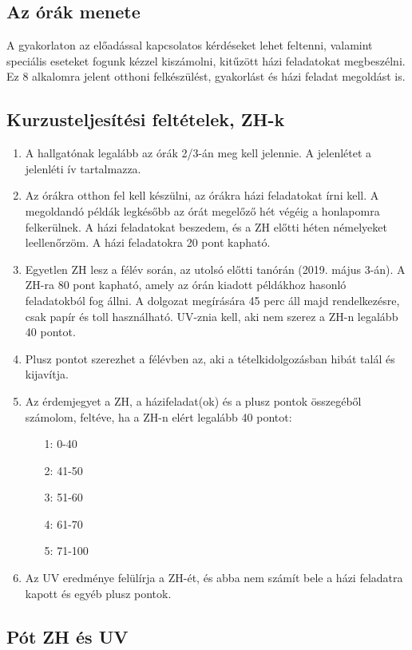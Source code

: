 \documentclass[12pt,a4paper]{scrartcl}
\begin{document}
\subsection{Az órák menete}
A gyakorlaton az előadással kapcsolatos kérdéseket lehet feltenni, valamint speciális eseteket fogunk kézzel kiszámolni, kitűzött házi feladatokat megbeszélni. Ez 8 alkalomra jelent otthoni felkészülést, gyakorlást és házi feladat megoldást is.

\subsection{Kurzusteljesítési feltételek, ZH-k}
\begin{enumerate}
\item A hallgatónak legalább az órák 2/3-án meg kell jelennie. A jelenlétet a jelenléti ív tartalmazza.
\item Az órákra otthon fel kell készülni, az órákra házi feladatokat írni kell. A megoldandó példák legkésőbb az órát megelőző hét végéig a honlapomra felkerülnek. A házi feladatokat beszedem, és a ZH előtti héten némelyeket leellenőrzöm. A házi feladatokra 20 pont kapható.
\item Egyetlen ZH lesz a félév során, az utolsó előtti tanórán (2019. május 3-án). A ZH-ra 80 pont kapható, amely az órán kiadott példákhoz hasonló feladatokból fog állni. A dolgozat megírására 45 perc áll majd rendelkezésre, csak papír és toll használható. UV-znia kell, aki nem szerez a ZH-n legalább 40 pontot.
\item Plusz pontot szerezhet a félévben az, aki a tételkidolgozásban hibát talál és kijavítja.
\item Az érdemjegyet a ZH, a házifeladat(ok) és a plusz pontok összegéből számolom, feltéve, ha a ZH-n elért legalább 40 pontot:
\begin{itemize}
\item[1:] 0-40
\item[2:] 41-50
\item[3:] 51-60
\item[4:] 61-70
\item[5:] 71-100
\end{itemize}

\item Az UV eredménye felülírja a ZH-ét, és abba nem számít bele a házi feladatra kapott és egyéb plusz pontok.
\end{enumerate}



\subsection{Pót ZH és UV}
\end{document}
